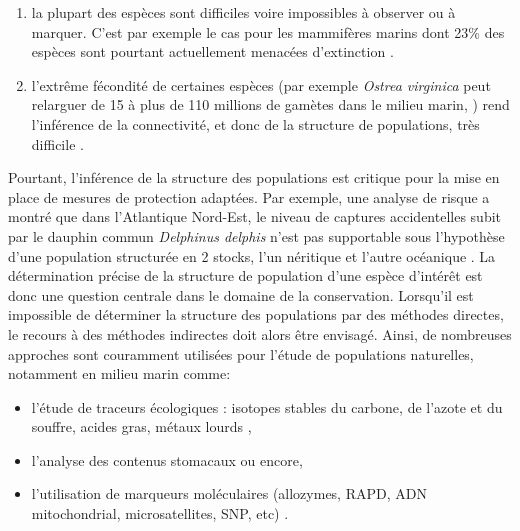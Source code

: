 \documentclass[a4paper,12pt,twoside]{article}\usepackage[]{graphicx}\usepackage[]{color}
\begin{document}
\begin {bibunit} [newbst]
\begin{enumerate}
	\item la plupart des espèces sont difficiles voire impossibles à observer ou à marquer. C'est par exemple le cas pour les mammifères marins dont 23\% des espèces sont pourtant actuellement menacées d'extinction \citep{schipper2008status}.
	\item l'extrême fécondité de certaines espèces (par exemple \emph{Ostrea virginica} peut relarguer de 15 à plus de 110 millions de gamètes dans le milieu marin, \citealp{galtsoff1930fecundity}) rend l'inférence de la connectivité, et donc de la structure de populations, très difficile \citep{gagnaire2015aa}.
\end{enumerate}

Pourtant, l'inférence de la structure des populations est critique pour la mise en place de mesures de protection adaptées. Par exemple, une analyse de risque a montré que dans l'Atlantique Nord-Est, le niveau de captures accidentelles subit par le dauphin commun \emph{Delphinus delphis} n'est pas supportable sous l'hypothèse d'une population structurée en 2 stocks, l'un néritique et l'autre océanique \citep{Mannocci2012}. La détermination précise de la structure de population d'une espèce d'intérêt est donc une question centrale dans le domaine de la conservation. Lorsqu'il est impossible de déterminer la structure des populations par des méthodes directes, le recours à des méthodes indirectes doit alors être envisagé. Ainsi, de nombreuses approches sont couramment utilisées pour l'étude de populations naturelles, notamment en milieu marin comme: 
\begin{itemize}
	\item l'étude de traceurs écologiques : isotopes stables du carbone, de l'azote et du souffre, acides gras, métaux lourds \citep{newman2000stock},
	\item l'analyse des contenus stomacaux \citep{spitz2006diet, spitz2011prey} ou encore,
	\item l'utilisation de marqueurs moléculaires (allozymes, RAPD, ADN mitochondrial, microsatellites, SNP, etc) \citep{pogson1995genetic, huang2000analysis}.
\end{itemize}


\end{bibunit}
\end{document}
